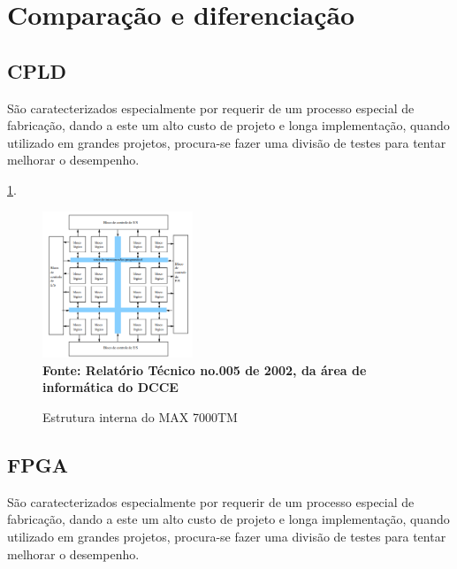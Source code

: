 \section{\esp Comparação e diferenciação}

\subsection{\esp CPLD}

São caratecterizados especialmente por requerir de um processo especial de fabricação, dando a este um alto custo de projeto e longa implementação, quando utilizado em grandes projetos, procura-se fazer uma divisão de testes para tentar melhorar o desempenho.

 \ref{fig:figura1}. 
\begin{figure}[ht]
	\centering	
	\caption[\hspace{0.1cm}]{Estrutura interna do MAX 7000TM}
\includegraphics[width=0.4\textwidth]{figuras/CPLD.png}
	 \vspace{-0.2cm}
	\\\textbf{\footnotesize Fonte: Relatório Técnico no.005 de 2002, da
área de informática do DCCE  }
	\label{fig:figura1}
\end{figure}
\vspace{-0.5cm}

 \newpage \subsection{\esp FPGA}

São caratecterizados especialmente por requerir de um processo especial de fabricação, dando a este um alto custo de projeto e longa implementação, quando utilizado em grandes projetos, procura-se fazer uma divisão de testes para tentar melhorar o desempenho.

